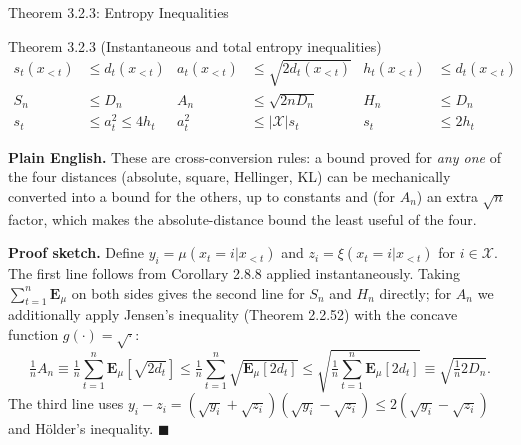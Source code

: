 \documentclass[aspectratio=169,10pt]{beamer}
\newcommand{\X}{\mathcal{X}}
\begin{document}
\begin{frame}[allowframebreaks]{Theorem 3.2.3: Entropy Inequalities}
  \begin{block}{Theorem 3.2.3 (Instantaneous and total entropy inequalities)}
    \begin{align*}
      s_t(x_{<t}) &\le d_t(x_{<t}) & a_t(x_{<t}) &\le \sqrt{2 d_t(x_{<t})} & h_t(x_{<t}) &\le d_t(x_{<t}) \\
      S_n &\le D_n & A_n &\le \sqrt{2nD_n} & H_n &\le D_n \\
      s_t &\le a_t^2 \le 4h_t & a_t^2 &\le |\X| s_t & s_t &\le 2h_t
    \end{align*}
  \end{block}
  \textbf{Plain English.} These are cross-conversion rules: a bound proved
  for \emph{any one} of the four distances (absolute, square, Hellinger, KL)
  can be mechanically converted into a bound for the others, up to constants
  and (for $A_n$) an extra $\sqrt{n}$ factor, which makes the absolute-distance
  bound the least useful of the four.

  \framebreak
  \textbf{Proof sketch.} Define $y_i=\mu(x_t{=}i|x_{<t})$ and
  $z_i=\xi(x_t{=}i|x_{<t})$ for $i\in\X$. The first line follows from Corollary
  2.8.8 applied instantaneously. Taking $\sum_{t=1}^n \mathbf{E}_\mu$ on both
  sides gives the second line for $S_n$ and $H_n$ directly; for $A_n$ we
  additionally apply Jensen's inequality (Theorem 2.2.52) with the concave
  function $g(\cdot)=\sqrt{\cdot}$:
  \[
    \tfrac1n A_n \equiv \tfrac1n\sum_{t=1}^n \mathbf{E}_\mu[\sqrt{2d_t}]
    \le \tfrac1n \sum_{t=1}^n \sqrt{\mathbf{E}_\mu[2d_t]}
    \le \sqrt{\tfrac1n\sum_{t=1}^n \mathbf{E}_\mu[2d_t]} \equiv \sqrt{\tfrac1n 2D_n}.
  \]
  The third line uses $y_i-z_i=(\sqrt{y_i}+\sqrt{z_i})(\sqrt{y_i}-\sqrt{z_i}) \le 2(\sqrt{y_i}-\sqrt{z_i})$
  and H\"older's inequality. $\blacksquare$
\end{frame}
\end{document}
